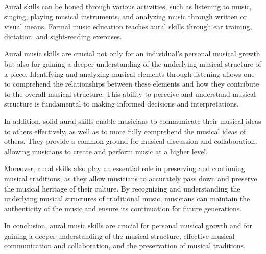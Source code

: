 Aural skills can be honed through various activities, such as listening to music, singing, playing musical instruments, and analyzing music through written or visual means. Formal music education teaches aural skills through ear training, dictation, and sight-reading exercises.

Aural music skills are crucial not only for an individual's personal musical growth but also for gaining a deeper understanding of the underlying musical structure of a piece. Identifying and analyzing musical elements through listening allows one to comprehend the relationships between these elements and how they contribute to the overall musical structure. This ability to perceive and understand musical structure is fundamental to making informed decisions and interpretations.

In addition, solid aural skills enable musicians to communicate their musical ideas to others effectively, as well as to more fully comprehend the musical ideas of others. They provide a common ground for musical discussion and collaboration, allowing musicians to create and perform music at a higher level.

Moreover, aural skills also play an essential role in preserving and continuing musical traditions, as they allow musicians to accurately pass down and preserve the musical heritage of their culture. By recognizing and understanding the underlying musical structures of traditional music, musicians can maintain the authenticity of the music and ensure its continuation for future generations.

In conclusion, aural music skills are crucial for personal musical growth and for gaining a deeper understanding of the musical structure, effective musical communication and collaboration, and the preservation of musical traditions.






